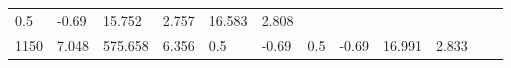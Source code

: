 \documentclass{article}
\begin{document}
\begin{longtable}[]{@{}llllllllllll@{}}
\begin{minipage}[t]{0.03\columnwidth}
0.5\strut
\end{minipage} & \begin{minipage}[t]{0.06\columnwidth}\raggedright\strut
-0.69\strut
\end{minipage} & \begin{minipage}[t]{0.06\columnwidth}\raggedright\strut
15.752\strut
\end{minipage} & \begin{minipage}[t]{0.08\columnwidth}\raggedright\strut
2.757\strut
\end{minipage} & \begin{minipage}[t]{0.06\columnwidth}\raggedright\strut
16.583\strut
\end{minipage} & \begin{minipage}[t]{0.09\columnwidth}\raggedright\strut
2.808\strut
\end{minipage}\tabularnewline
\begin{minipage}[t]{0.03\columnwidth}\raggedright\strut
1150\strut
\end{minipage} & \begin{minipage}[t]{0.06\columnwidth}\raggedright\strut
7.048\strut
\end{minipage} & \begin{minipage}[t]{0.06\columnwidth}\raggedright\strut
575.658\strut
\end{minipage} & \begin{minipage}[t]{0.08\columnwidth}\raggedright\strut
6.356\strut
\end{minipage} & \begin{minipage}[t]{0.03\columnwidth}\raggedright\strut
0.5\strut
\end{minipage} & \begin{minipage}[t]{0.06\columnwidth}\raggedright\strut
-0.69\strut
\end{minipage} & \begin{minipage}[t]{0.03\columnwidth}\raggedright\strut
0.5\strut
\end{minipage} & \begin{minipage}[t]{0.06\columnwidth}\raggedright\strut
-0.69\strut
\end{minipage} & \begin{minipage}[t]{0.06\columnwidth}\raggedright\strut
16.991\strut
\end{minipage} & \begin{minipage}[t]{0.08\columnwidth}\raggedright\strut
2.833\strut
\end{minipage} & \begin{minipage}[t]{0.06\columnwidth}\raggedright\strut

\end{minipage}
\end{longtable}
\end{document}
